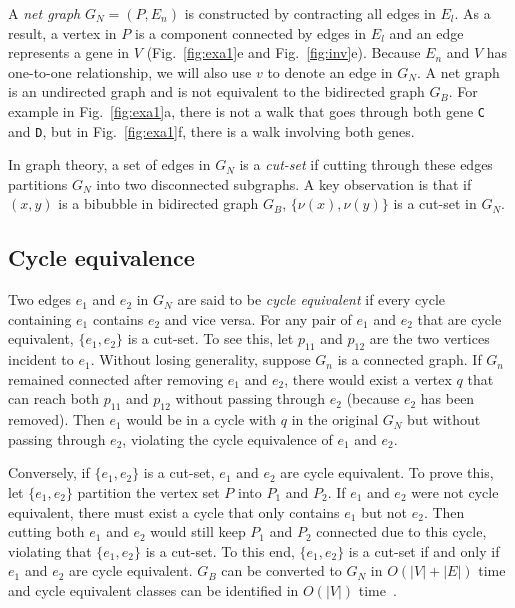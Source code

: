 \documentclass[webpdf,contemporary,large,namedate]{oup-authoring-template}%
\begin{document}
A \emph{net graph} $G_N=(P,E_n)$ is constructed by contracting all edges in $E_l$.
As a result, a vertex in $P$ is a component connected by edges in $E_l$
and an edge represents a gene in $V$ (Fig.~\ref{fig:exa1}e and Fig.~\ref{fig:inv}e).
Because $E_n$ and $V$ has one-to-one relationship, we will also use $v$ to denote an edge in $G_N$.
A net graph is an undirected graph and is not equivalent to the bidirected graph $G_B$.
For example in Fig.~\ref{fig:exa1}a, there is not a walk that goes through both gene {\tt C} and {\tt D},
but in Fig.~\ref{fig:exa1}f, there is a walk involving both genes.

In graph theory, a set of edges in $G_N$ is a \emph{cut-set} if cutting through these edges
partitions $G_N$ into two disconnected subgraphs.
A key observation is that if $(x,y)$ is a bibubble in bidirected graph $G_B$,
$\{\nu(x),\nu(y)\}$ is a cut-set in $G_N$.

\subsection{Cycle equivalence}

Two edges $e_1$ and $e_2$ in $G_N$ are said to be \emph{cycle equivalent}
if every cycle containing $e_1$ contains $e_2$ and vice versa.
For any pair of $e_1$ and $e_2$ that are cycle equivalent, $\{e_1,e_2\}$ is a cut-set.
To see this, let $p_{11}$ and $p_{12}$ are the two vertices incident to $e_1$.
Without losing generality, suppose $G_n$ is a connected graph.
If $G_n$ remained connected after removing $e_1$ and $e_2$,
there would exist a vertex $q$ that can reach both $p_{11}$ and $p_{12}$ without passing through $e_2$ (because $e_2$ has been removed).
Then $e_1$ would be in a cycle with $q$ in the original $G_N$ but without passing through $e_2$,
violating the cycle equivalence of $e_1$ and $e_2$.

Conversely, if $\{e_1,e_2\}$ is a cut-set, $e_1$ and $e_2$ are cycle equivalent.
To prove this, let $\{e_1,e_2\}$ partition the vertex set $P$ into $P_1$ and $P_2$.
If $e_1$ and $e_2$ were not cycle equivalent, there must exist a cycle that only contains $e_1$ but not $e_2$.
Then cutting both $e_1$ and $e_2$ would still keep $P_1$ and $P_2$ connected due to this cycle,
violating that $\{e_1,e_2\}$ is a cut-set.
To this end, $\{e_1,e_2\}$ is a cut-set if and only if $e_1$ and $e_2$ are cycle equivalent.
$G_B$ can be converted to $G_N$ in $O(|V|+|E|)$ time
and cycle equivalent classes can be identified in $O(|V|)$ time~\citep{DBLP:conf/pldi/JohnsonPP94}.
\end{document}
